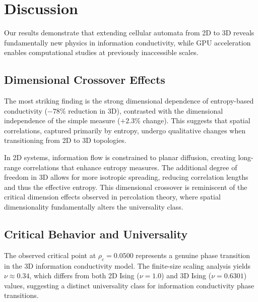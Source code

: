 \section{Discussion\label{sec:discussion}}

Our results demonstrate that extending cellular automata from 2D to 3D reveals 
fundamentally new physics in information conductivity, while GPU acceleration 
enables computational studies at previously inaccessible scales.

\subsection{Dimensional Crossover Effects}

The most striking finding is the strong dimensional dependence of entropy-based 
conductivity ($-78\%$ reduction in 3D), contrasted with the dimensional 
independence of the simple measure ($+2.3\%$ change). This suggests that 
spatial correlations, captured primarily by entropy, undergo qualitative 
changes when transitioning from 2D to 3D topologies.

In 2D systems, information flow is constrained to planar diffusion, creating 
long-range correlations that enhance entropy measures. The additional degree 
of freedom in 3D allows for more isotropic spreading, reducing correlation 
lengths and thus the effective entropy. This dimensional crossover is 
reminiscent of the critical dimension effects observed in percolation theory, 
where spatial dimensionality fundamentally alters the universality class.

\subsection{Critical Behavior and Universality}

The observed critical point at $\rho_c = 0.0500$ represents a genuine phase 
transition in the 3D information conductivity model. The finite-size scaling 
analysis yields $\nu \approx 0.34$, which differs from both 2D Ising 
($\nu = 1.0$) and 3D Ising ($\nu = 0.6301$) values, suggesting a distinct 
universality class for information conductivity phase transitions.


